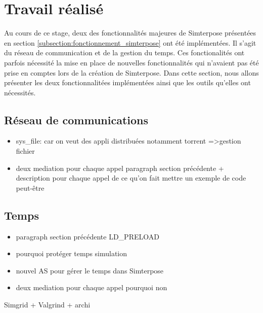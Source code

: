 \section{Travail réalisé}
\label{section:work}
Au cours de ce stage, deux des fonctionnalités majeures de Simterpose présentées en section \ref{subsection:fonctionnement_simterpose} ont été implémentées. Il s'agit du réseau de communication et de la gestion du temps. Ces fonctionalités ont parfois nécessité la mise en place de nouvelles fonctionnalités qui n'avaient pas été prise en comptes lors de la création de Simterpose. Dans cette section, nous allons présenter les deux fonctionnalitées implémentées ainsi que les outils qu'elles ont nécessités.

\subsection{Réseau de communications}

\begin{itemize}
\item sys\_file: car on veut des appli distribuées notamment torrent =>gestion fichier
\item deux mediation pour chaque appel paragraph section précédente + description pour chaque appel de ce qu'on fait mettre un exemple de code peut-être
\end{itemize}

\subsection{Temps}
\begin{itemize}
\item paragraph section précédente LD\_PRELOAD
\item pourquoi protéger temps simulation
\item nouvel AS pour gérer le temps dans Simterpose
\item deux mediation pour chaque appel pourquoi non
\end{itemize}

Simgrid + Valgrind + archi 

